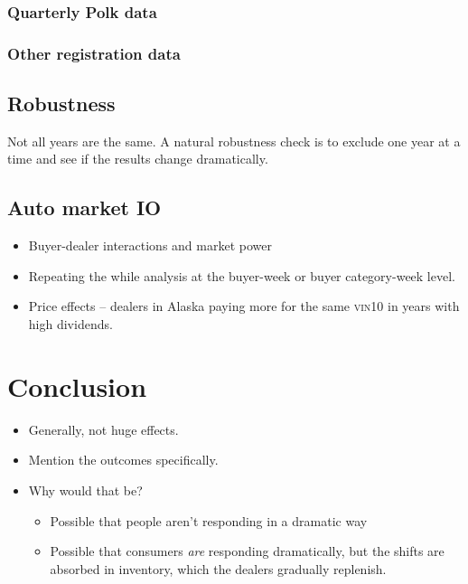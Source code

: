 \documentclass[11pt,letterpaper,oneside]{article}
\newcommand{\vin}{\textsc{vin}}
\begin{document}
\begin{doublespacing}
\subsubsection{Quarterly Polk data}
\subsubsection{Other registration data}

\subsection{Robustness}
Not all years are the same.
A natural robustness check is to exclude one year at a time and see if the results change dramatically.

\subsection{Auto market IO}
\begin{itemize}
    \item Buyer-dealer interactions and market power
    \item Repeating the while analysis at the buyer\hyp{}week or buyer category\hyp{}week level.
    \item Price effects -- dealers in Alaska paying more for the same \vin10 in years with high dividends.

\end{itemize}



\section{Conclusion}

\begin{itemize}
    \item Generally, not huge effects.
    \item Mention the outcomes specifically.
    \item Why would that be?
    \begin{itemize}
        \item Possible that people aren't responding in a dramatic way
        \item Possible that consumers \emph{are} responding dramatically, but the shifts are absorbed in inventory, which the dealers gradually replenish.

    \end{itemize}
\end{itemize}

\end{doublespacing}
\FloatBarrier
\pagebreak
\printbibliography

\begin{refsection}
\nocite{*}
\printbibliography[heading=subbibliography, title={Software Used}]
\end{refsection}
\end{document}
